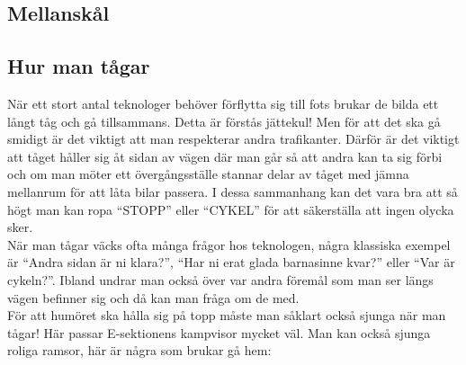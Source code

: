 {\subsection*{Mellanskål} 



\subsection*{Hur man tågar}

När ett stort antal teknologer behöver förflytta sig till fots brukar de bilda ett långt tåg och gå tillsammans.
Detta är förstås jättekul! Men för att det ska gå smidigt är det viktigt att man respekterar andra trafikanter.
Därför är det viktigt att tåget håller sig åt sidan av vägen där man går så att andra kan ta sig förbi och om
man möter ett övergångsställe stannar delar av tåget med jämna mellanrum för att låta bilar passera. 
I dessa sammanhang kan det vara bra att så högt man kan ropa “STOPP” eller “CYKEL” för att säkerställa att ingen olycka sker.
\\
När man tågar väcks ofta många frågor hos teknologen, några klassiska exempel är “Andra sidan är ni klara?”,
“Har ni erat glada barnasinne kvar?” eller “Var är cykeln?”. Ibland undrar man också över var andra föremål
 som man ser längs vägen befinner sig och då kan man fråga om de med.
\\
För att humöret ska hålla sig på topp måste man såklart också sjunga när man tågar!
 Här passar E-sektionens kampvisor mycket väl. Man kan också sjunga roliga ramsor, här är några som brukar gå hem:
\\

}
